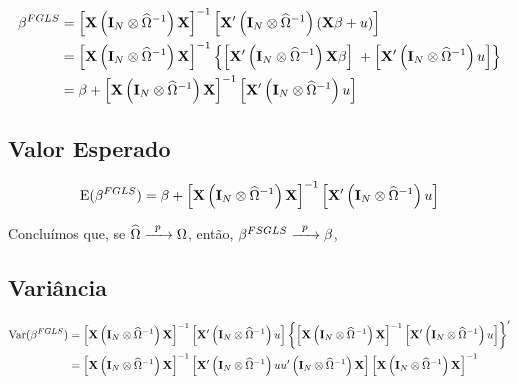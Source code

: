 \documentclass[11pt, oneside, a4paper, article]{article}
\numberwithin{equation}{section}
\begin{document}
\begin{description}
	\vspace{-1.5 em}
	\begin{align*}
		\beta^{FGLS}
		&= 
		\left[  \mathbf{X} \left( \mathbf{I}_{N} \otimes \widehat{\Omega}^{-1} \right) \mathbf{X} \right]^{-1}
		\left[  \mathbf{X}' \left( \mathbf{I}_{N} \otimes \widehat{\Omega}^{-1} \right) (\mathbf{X} \beta + u) \right]
		\\
		&= 
		\left[ \mathbf{X} \left( \mathbf{I}_{N} \otimes \widehat{\Omega}^{-1} \right) \mathbf{X} \right]^{-1}
		\left\{ 
			\left[ \mathbf{X}' \left( \mathbf{I}_{N} \otimes \widehat{\Omega}^{-1} \right) \mathbf{X} \beta \right]
			\; +
			\left[ \mathbf{X}' \left( \mathbf{I}_{N} \otimes \widehat{\Omega}^{-1} \right) u \right]
		\right\}
		\\
		&= 
		\beta +
		\left[ \mathbf{X} \left( \mathbf{I}_{N} \otimes \widehat{\Omega}^{-1} \right) \mathbf{X} \right]^{-1}
		\left[ \mathbf{X}' \left( \mathbf{I}_{N} \otimes \widehat{\Omega}^{-1} \right) u \right]
	\end{align*}

	\subsection{Valor Esperado}

	\vspace{-1 em}
	\begin{align*}
		\text{E}(\beta^{FGLS})
		= 
		\beta +
		\left[ \mathbf{X} \left( \mathbf{I}_{N} \otimes \widehat{\Omega}^{-1} \right) \mathbf{X} \right]^{-1}
		\left[ \mathbf{X}' \left( \mathbf{I}_{N} \otimes \widehat{\Omega}^{-1} \right) u \right]
	\end{align*}

	Concluímos que, se 
	$\widehat{\Omega} \xrightarrow{\enskip p \enskip} \Omega$,
	então,
	$\beta^{FSGLS} \xrightarrow{\enskip p \enskip} \beta$,

	\subsection{Variância}

	\vspace{-1 em}
	\begin{align*}
		\text{Var}(\beta^{FGLS})
		&= 
		\left[ \mathbf{X} \left( \mathbf{I}_{N} \otimes \widehat{\Omega}^{-1} \right) \mathbf{X} \right]^{-1}
		\left[ \mathbf{X}' \left( \mathbf{I}_{N} \otimes \widehat{\Omega}^{-1} \right) u \right]
		\left\{ 
			\left[ \mathbf{X} \left( \mathbf{I}_{N} \otimes \widehat{\Omega}^{-1} \right) \mathbf{X} \right]^{-1}
			\left[ \mathbf{X}' \left( \mathbf{I}_{N} \otimes \widehat{\Omega}^{-1} \right) u \right]
		\right\}^{\prime}
		\\
		&=
		\left[ \mathbf{X} \left( \mathbf{I}_{N} \otimes \widehat{\Omega}^{-1} \right) \mathbf{X} \right]^{-1}
		\left[
			\mathbf{X}' \left( \mathbf{I}_{N} \otimes \widehat{\Omega}^{-1} \right) 
			u u'
			\left( \mathbf{I}_{N} \otimes \widehat{\Omega}^{-1} \right) \mathbf{X}
		\right]
		\left[ \mathbf{X} \left( \mathbf{I}_{N} \otimes \widehat{\Omega}^{-1} \right) \mathbf{X} \right]^{-1}
	\end{align*}


\end{description}
\end{document}
